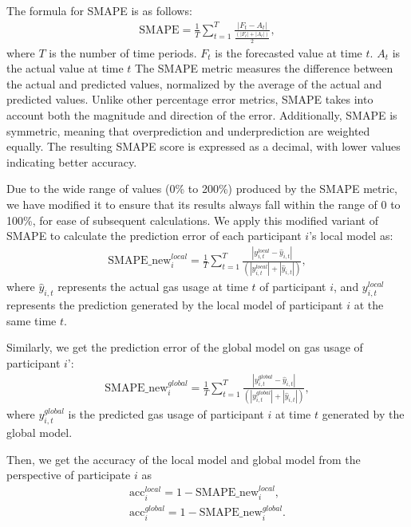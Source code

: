 \documentclass{article}
\begin{document}
The formula for SMAPE is as follows:
\begin{equation}
\label{eq:smape}
\begin{aligned}
\text{SMAPE} = \frac{1}{T} \sum_{t=1}^{T} \frac{|F_t - A_t|}{\frac{(|F_t| + |A_t|)}{2}},
\end{aligned}
\end{equation}
where $T$ is the number of time periods. $F_t$ is the forecasted value at time $t$. $A_t$ is the actual value at time $t$
The SMAPE metric measures the difference between the actual and predicted values, normalized by the average of the actual and predicted values. Unlike other percentage error metrics, SMAPE takes into account both the magnitude and direction of the error. Additionally, SMAPE is symmetric, meaning that overprediction and underprediction are weighted equally. The resulting SMAPE score is expressed as a decimal, with lower values indicating better accuracy. 

Due to the wide range of values (0\% to 200\%) produced by the SMAPE metric, we have modified it to ensure that its results always fall within the range of 0 to 100\%, for ease of subsequent calculations. We apply this modified variant of SMAPE to calculate the prediction error of each participant $i$'s local model as:
\begin{equation}
\label{eq:smape_new_local}
\begin{aligned}
\text{SMAPE\_new}^{local}_i = \frac{1}{T} \sum_{t=1}^{T} \frac{|y_{i,t}^{local} - \hat{y}_{i,t}|}{(|y_{i,t}^{local}| + |\hat{y}_{i,t}|)},
\end{aligned}
\end{equation}
where $\hat{y}_{i,t}$ represents the actual gas usage at time $t$ of participant $i$, and $y_{i,t}^{local}$ represents the prediction generated by the local model of participant $i$ at the same time $t$.

Similarly, we get the prediction error of the global model on gas usage of participant $i$':
\begin{equation}
\label{eq:smape_new_global}
\begin{aligned}
\text{SMAPE\_new}^{global}_i = \frac{1}{T} \sum_{t=1}^{T} \frac{|y_{i,t}^{global} - \hat{y}_{i,t}|}{(|y_{i,t}^{global}| + |\hat{y}_{i,t}|)},
\end{aligned}
\end{equation}
where $y_{i,t}^{global}$ is the predicted gas usage of participant $i$ at time $t$ generated by the global model.

Then, we get the accuracy of the local model and global model from the perspective of participate $i$ as
\begin{equation}
\label{eq:acc}
\begin{aligned}
\text{acc}_i^{local} = 1 - \text{SMAPE\_new}^{local}_i, \\
\text{acc}_i^{global} = 1 - \text{SMAPE\_new}^{global}_i.
\end{aligned}
\end{equation}
\end{document}
